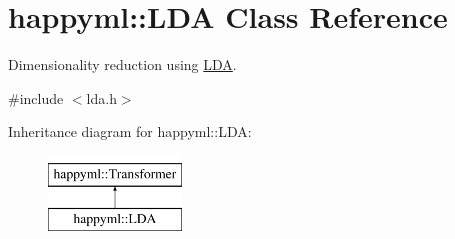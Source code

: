 \hypertarget{classhappyml_1_1LDA}{}\section{happyml\+:\+:L\+DA Class Reference}
\label{classhappyml_1_1LDA}


Dimensionality reduction using \hyperlink{classhappyml_1_1LDA}{L\+DA}.  




{\ttfamily \#include $<$lda.\+h$>$}

Inheritance diagram for happyml\+:\+:L\+DA\+:\begin{figure}[H]
\begin{center}
\leavevmode
\includegraphics[height=2.000000cm]{classhappyml_1_1LDA}
\end{center}
\end{figure}
